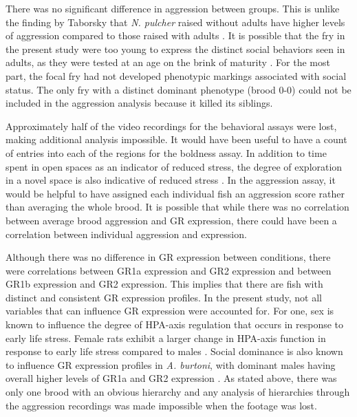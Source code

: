 \documentclass[12pt,twoside]{reedthesis}
\begin{document}
There was no significant difference in aggression between groups. This is unlike the
finding by Taborsky that \textit{N. pulcher} raised without adults have higher levels of
aggression compared to those raised with adults \citep{arnold_social_2010}. It
is possible that the fry in the present study were too young to express the
distinct social behaviors seen in adults, as they were tested at an age on the
brink of maturity \citep{fernald_quantitative_1977}. For the most part, the focal fry had not developed
phenotypic markings associated with social status. The only fry with a distinct
dominant phenotype (brood 0-0) could not be included in
the aggression analysis because it killed its siblings.

Approximately half of the video recordings for the behavioral assays
were lost, making additional analysis impossible. It would have been useful to
have a count of entries into each of the regions for the boldness assay. In
addition to time spent in open spaces as an indicator of reduced
stress, the degree of exploration in a novel space is also indicative of
reduced stress \citep{bannier_early_2017}. In the aggression assay, it would be helpful to have assigned
each individual fish an aggression score rather than averaging the whole brood.
It is possible that while there was no correlation between average brood
aggression and GR expression, there could have been a correlation between
individual aggression and expression. 

Although there was no difference in GR expression between conditions, there were
correlations between GR1a expression and GR2 expression and between GR1b
expression and GR2 expression. This implies that there are fish with distinct
and consistent GR expression profiles. In the present study, not all variables that can influence GR expression were
accounted for. For one, sex is known to influence the degree of HPA-axis
regulation that occurs in response to early life stress. Female rats exhibit a
larger change in HPA-axis function in response to early life stress compared to males \citep{mccormick_sex-specific_1995}. Social dominance is also known to influence
GR expression profiles in \textit{A. burtoni}, with dominant
males having overall higher levels of GR1a and GR2 expression
\citep{korzan_social_2014}. As stated above, there was only one brood with an
obvious hierarchy and any analysis of hierarchies through the aggression
recordings was made impossible when the footage was lost.
\end{document}
